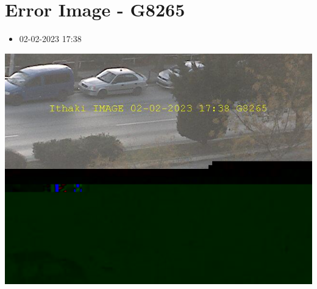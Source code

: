 \documentclass[10pt,a4paper]{article}
\begin{document}
\section*{\textlatin{Error Image - G8265}}
\begin{itemize}
  \item 02-02-2023 17:38
\end{itemize}
\begin{center}
  \includegraphics[scale=0.5]{errorImage.png}
  \newline
  \newline
  \newline
  \newline
  \newline
\end{center}
\end{document}
